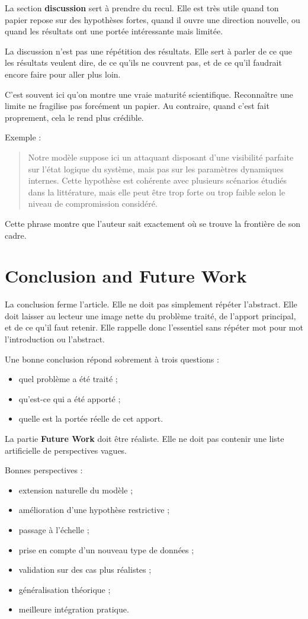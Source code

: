 \documentclass[11pt,a4paper]{article}
\theoremstyle{definition}
\begin{document}
La section \textbf{discussion} sert à prendre du recul. Elle est très utile quand ton papier repose sur des hypothèses fortes, quand il ouvre une direction nouvelle, ou quand les résultats ont une portée intéressante mais limitée.

La discussion n'est pas une répétition des résultats. Elle sert à parler de ce que les résultats veulent dire, de ce qu'ils ne couvrent pas, et de ce qu'il faudrait encore faire pour aller plus loin.

C'est souvent ici qu'on montre une vraie maturité scientifique. Reconnaître une limite ne fragilise pas forcément un papier. Au contraire, quand c'est fait proprement, cela le rend plus crédible.

Exemple :
\begin{quote}
Notre modèle suppose ici un attaquant disposant d'une visibilité parfaite sur l'état logique du système, mais pas sur les paramètres dynamiques internes. Cette hypothèse est cohérente avec plusieurs scénarios étudiés dans la littérature, mais elle peut être trop forte ou trop faible selon le niveau de compromission considéré.
\end{quote}

Cette phrase montre que l'auteur sait exactement où se trouve la frontière de son cadre.


\section{Conclusion and Future Work}


La conclusion ferme l'article. Elle ne doit pas simplement répéter l'abstract. Elle doit laisser au lecteur une image nette du problème traité, de l'apport principal, et de ce qu'il faut retenir. Elle rappelle donc l'essentiel sans répéter mot pour mot l'introduction ou l'abstract.

Une bonne conclusion répond sobrement à trois questions :
\begin{itemize}
    \item quel problème a été traité ;
    \item qu'est-ce qui a été apporté ;
    \item quelle est la portée réelle de cet apport.
\end{itemize}

La partie \textbf{Future Work} doit être réaliste. Elle ne doit pas contenir une liste artificielle de perspectives vagues.

Bonnes perspectives :
\begin{itemize}
    \item extension naturelle du modèle ;
    \item amélioration d'une hypothèse restrictive ;
    \item passage à l'échelle ;
    \item prise en compte d'un nouveau type de données ;
    \item validation sur des cas plus réalistes ;
    \item généralisation théorique ;
    \item meilleure intégration pratique.
\end{itemize}
\end{document}
